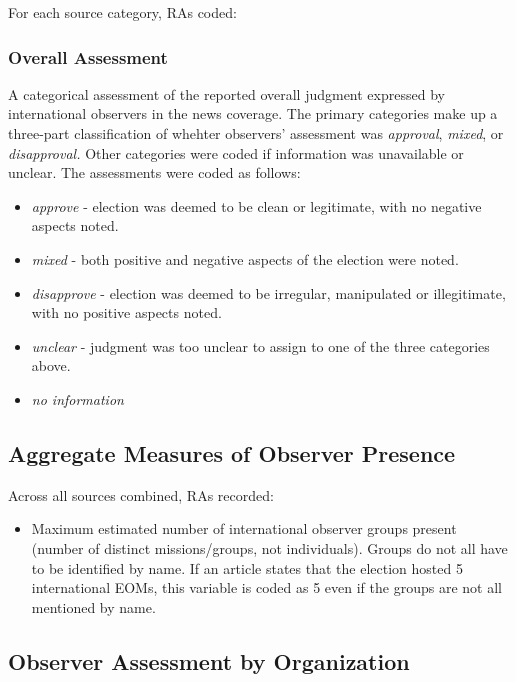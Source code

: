 \documentclass[USletter,12pt, titlepage]{article} %
\begin{document}
For each source category, RAs coded:

\subsubsection{Overall Assessment}

A categorical assessment of the reported overall judgment expressed by international observers in the news coverage. The primary categories make up a three-part classification of whehter observers' assessment was \textit{approval}, \textit{mixed}, or \textit{disapproval.} Other categories were coded if information was unavailable or unclear. The assessments were coded as follows: 
\begin{itemize}
    \item \textit{approve} - election was deemed to be clean or legitimate, with no negative aspects noted.
    \item \textit{mixed} - both positive and negative aspects of the election were noted.
    \item \textit{disapprove} - election was deemed to be irregular, manipulated or illegitimate, with no positive aspects noted. 
    \item \textit{unclear} - judgment was too unclear to assign to one of the three categories above. 
    \item \textit{no information}
    \end{itemize}


\subsection{Aggregate Measures of Observer Presence}

Across all sources combined, RAs recorded:

\begin{itemize}
    \item Maximum estimated number of international observer groups present (number of distinct missions/groups, not individuals). Groups do not all have to be identified by name. If an article states that the election hosted 5 international EOMs, this variable is coded as 5 even if the groups are not all mentioned by name.
\end{itemize}

\subsection{Observer Assessment by Organization}
\end{document}
